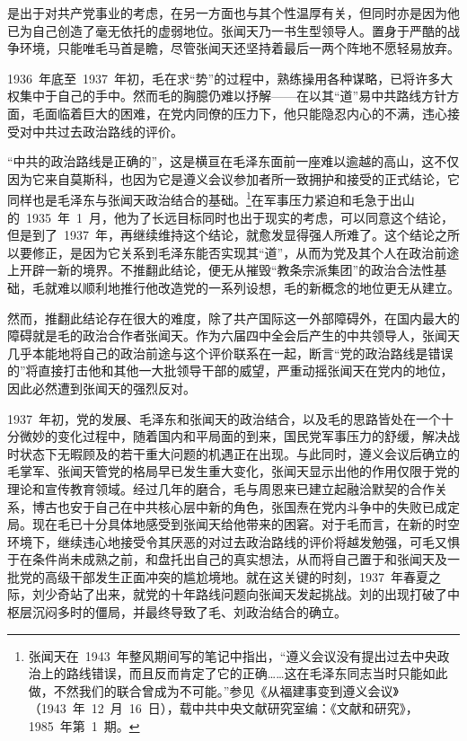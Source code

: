 是出于对共产党事业的考虑，在另一方面也与其个性温厚有关，但同时亦是因为他已为自己创造了毫无依托的虚弱地位。张闻天乃一书生型领导人。置身于严酷的战争环境，只能唯毛马首是瞻，尽管张闻天还坚持着最后一两个阵地不愿轻易放弃。

1936~年底至~1937~年初，毛在求“势”的过程中，熟练操用各种谋略，已将许多大权集中于自己的手中。然而毛的胸臆仍难以抒解——在以其“道”易中共路线方针方面，毛面临着巨大的困难，在党内同僚的压力下，他只能隐忍内心的不满，违心接受对中共过去政治路线的评价。

“中共的政治路线是正确的”，这是横亘在毛泽东面前一座难以逾越的高山，这不仅因为它来自莫斯科，也因为它是遵义会议参加者所一致拥护和接受的正式结论，它同样也是毛泽东与张闻天政治结合的基础。\footnote{张闻天在~1943~年整风期间写的笔记中指出，“遵义会议没有提出过去中央政治上的路线错误，而且反而肯定了它的正确……这在毛泽东同志当时只能如此做，不然我们的联合曾成为不可能。”参见《从福建事变到遵义会议》（1943~年~12~月~16~日），载中共中央文献研究室编：《文献和研究》，1985~年第~1~期。}在军事压力紧迫和毛急于出山的~1935~年~1~月，他为了长远目标同时也出于现实的考虑，可以同意这个结论，但是到了~1937~年，再继续维持这个结论，就愈发显得强人所难了。这个结论之所以要修正，是因为它关系到毛泽东能否实现其“道”，从而为党及其个人在政治前途上开辟一新的境界。不推翻此结论，便无从摧毁“教条宗派集团”的政治合法性基础，毛就难以顺利地推行他改造党的一系列设想，毛的新概念的地位更无从建立。

然而，推翻此结论存在很大的难度，除了共产国际这一外部障碍外，在国内最大的障碍就是毛的政治合作者张闻天。作为六届四中全会后产生的中共领导人，张闻天几乎本能地将自己的政治前途与这个评价联系在一起，断言“党的政治路线是错误的”将直接打击他和其他一大批领导干部的威望，严重动摇张闻天在党内的地位，因此必然遭到张闻天的强烈反对。

1937~年初，党的发展、毛泽东和张闻天的政治结合，以及毛的思路皆处在一个十分微妙的变化过程中，随着国内和平局面的到来，国民党军事压力的舒缓，解决战时状态下无暇顾及的若干重大问题的机遇正在出现。与此同时，遵义会议后确立的毛掌军、张闻天管党的格局早已发生重大变化，张闻天显示出他的作用仅限于党的理论和宣传教育领域。经过几年的磨合，毛与周恩来已建立起融洽默契的合作关系，博古也安于自己在中共核心层中新的角色，张国焘在党内斗争中的失败已成定局。现在毛已十分具体地感受到张闻天给他带来的困窘。对于毛而言，在新的时空环境下，继续违心地接受令其厌恶的对过去政治路线的评价将越发勉强，可毛又惧于在条件尚未成熟之前，和盘托出自己的真实想法，从而将自己置于和张闻天及一批党的高级干部发生正面冲突的尴尬境地。就在这关键的时刻，1937~年春夏之际，刘少奇站了出来，就党的十年路线问题向张闻天发起挑战。刘的出现打破了中枢层沉闷多时的僵局，并最终导致了毛、刘政治结合的确立。

